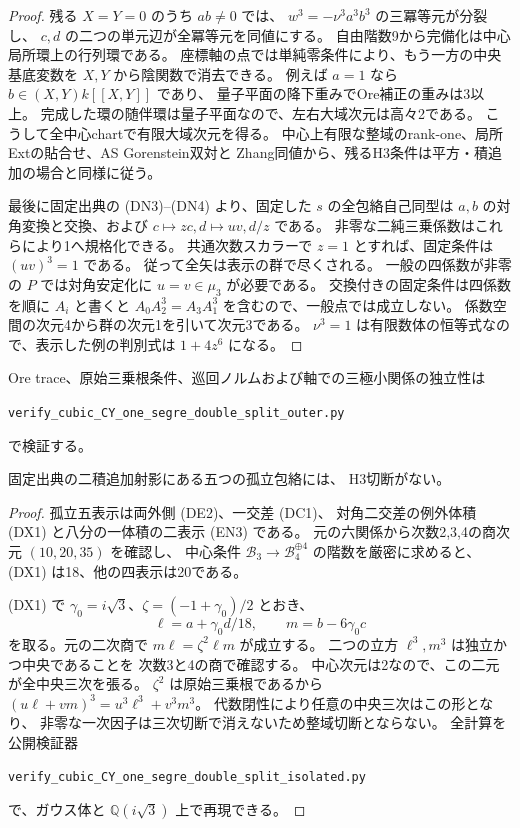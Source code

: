 \begin{proof}
残る $X=Y=0$ のうち $ab\ne0$ では、
$w^3=-\nu^3a^3b^3$ の三冪等元が分裂し、
$c,d$ の二つの単元辺が全冪等元を同値にする。
自由階数9から完備化は中心局所環上の行列環である。
座標軸の点では単純零条件により、もう一方の中央基底変数を
$X,Y$ から陰関数で消去できる。
例えば $a=1$ なら $b\in(X,Y)k[[X,Y]]$ であり、
量子平面の降下重みでOre補正の重みは3以上。
完成した環の随伴環は量子平面なので、左右大域次元は高々2である。
こうして全中心chartで有限大域次元を得る。
中心上有限な整域のrank-one、局所Extの貼合せ、AS Gorenstein双対と
Zhang同値から、残るH3条件は平方・積追加の場合と同様に従う。

最後に固定出典の (DN3)--(DN4) より、固定した $s$ の全包絡自己同型は
$a,b$ の対角変換と交換、および $c\mapsto zc,d\mapsto uv,d/z$ である。
非零な二純三乗係数はこれらにより1へ規格化できる。
共通次数スカラーで $z=1$ とすれば、固定条件は $(uv)^3=1$ である。
従って全矢は表示の群で尽くされる。
一般の四係数が非零の $P$ では対角安定化に $u=v\in\mu_3$ が必要である。
交換付きの固定条件は四係数を順に $A_i$ と書くと
$A_0 A_2^3=A_3 A_1^3$ を含むので、一般点では成立しない。
係数空間の次元4から群の次元1を引いて次元3である。
$\nu^3=1$ は有限数体の恒等式なので、表示した例の判別式は $1+4z^6$ になる。
\end{proof}

Ore trace、原始三乗根条件、巡回ノルムおよび軸での三極小関係の独立性は
\par\noindent\texttt{verify\_cubic\_CY\_one\_segre\_double\_split\_outer.py}
\par
で検証する。

\begin{proposition}\label{prop:cubic-CY-one-segre-double-split-isolated-empty}
固定出典\cite{AS4CYpinned}の二積追加射影にある五つの孤立包絡には、
H3切断がない。
\end{proposition}
\begin{proof}
孤立五表示は両外側 (DE2)、一交差 (DC1)、
対角二交差の例外体積 (DX1) と八分の一体積の二表示 (EN3) である。
元の六関係から次数2,3,4の商次元 $(10,20,35)$ を確認し、
中心条件 $\mathcal B_3\to\mathcal B_4^{\oplus4}$ の階数を厳密に求めると、
(DX1) は18、他の四表示は20である。

(DX1) で $\gamma_0=i\sqrt3$、$\zeta=(-1+\gamma_0)/2$ とおき、
\[
 \ell=a+\gamma_0d/18,\qquad m=b-6\gamma_0 c
\]
を取る。元の二次商で $m\ell=\zeta^2\ell m$ が成立する。
二つの立方 $\ell^3,m^3$ は独立かつ中央であることを
次数3と4の商で確認する。
中心次元は2なので、この二元が全中央三次を張る。
$\zeta^2$ は原始三乗根であるから
$(u\ell+v m)^3=u^3\ell^3+v^3m^3$。
代数閉性により任意の中央三次はこの形となり、
非零な一次因子は三次切断で消えないため整域切断とならない。
全計算を公開検証器
\par\noindent\texttt{verify\_cubic\_CY\_one\_segre\_double\_split\_isolated.py}
\par\noindent
で、ガウス体と $\mathbb Q(i\sqrt3)$ 上で再現できる。
\end{proof}

